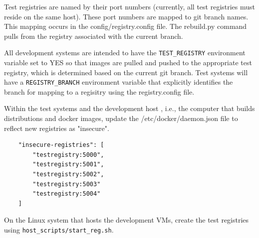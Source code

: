 \documentclass[12pt]{article}
\begin{document}
Test registries are named by their port numbers (currently, all test registries must reside on the same host).  
These port numbers are mapped to git branch names.  This mapping occurs in the 
config/registry.config file.
The rebuild.py command pulls from the registry associated with the current branch.

All development systems are intended to have the {\tt TEST\_REGISTRY} environment variable set to YES so that images are
pulled and pushed to the appropriate test registry, which is determined based on the current git branch.  Test systems
will have a {\tt REGISTRY\_BRANCH} environment variable that explicitly identifies the branch for mapping to a regisitry
using the registry.config file.

Within the test systems and the development host , i.e., the computer that builds distributions and docker images, update 
the /etc/docker/daemon.json file to reflect new registries as "insecure".
\begin{verbatim}
    "insecure-registries": [
        "testregistry:5000",
        "testregistry:5001",
        "testregistry:5002",
        "testregistry:5003"
        "testregistry:5004"
    ]
\end{verbatim}
\noindent On the Linux system that hosts the development VMs, create the test registries using {\tt host\_scripts/start\_reg.sh}.
\end{document}
